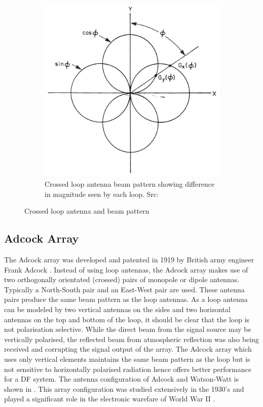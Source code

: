 \begin{figure}
\begin{subfigure}[b]{0.4\textwidth}
    \includegraphics[width=\textwidth]{./img/lit_review/loop_antenna_crossed_beam}
    \caption{Crossed loop antenna beam pattern showing difference in magnitude seen by each loop. Src: \cite{jenkins1991smallaperture}}
  \end{subfigure}
  \caption{Crossed loop antenna and beam pattern}
  \label{fig:lit_crossed_loop_antenna}
\end{figure}

\subsection{Adcock Array}
The Adcock array was developed and patented in 1919 by British army engineer Frank Adcock \cite{gething1991radio}.
Instead of using loop antennas, the Adcock array makes use of two orthogonally orientated (crossed) pairs of monopole or dipole antennas. Typically a North-South pair and an East-West pair are used. These antenna pairs produce the same beam pattern as the loop antennas. 
As a loop antenna can be modeled by two vertical antennas on the sides and two horizontal antennas on the top and bottom of the loop, it should be clear that the loop is not polarisation selective. While the direct beam from the signal source may be vertically polarised, the reflected beam from atmospheric reflection was also being received and corrupting the signal output of the array.
The Adcock array which uses only vertical elements maintains the same beam pattern as the loop but is not sensitive to horizontally polarised radiation hence offers better performance for a DF system.
The antenna configuration of Adcock and Watson-Watt is shown in .
This array configuration was studied extensively in the 1930's and played a significant role in the electronic warefare of World War II \cite{gething1991radio}.

